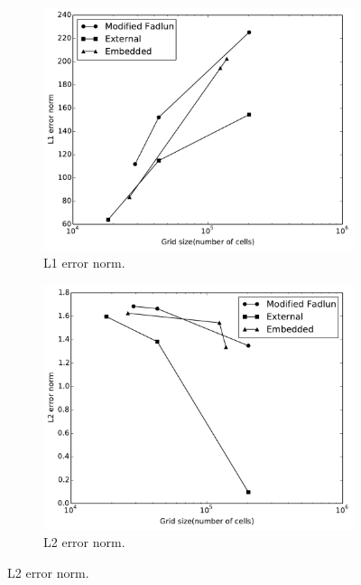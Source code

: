\begin{figure}[H]
	\centering
	\begin{subfigure}{0.6\textwidth}
		\includegraphics[width=\linewidth]{L1_error_norm}
		\caption{L1 error norm.}
	\end{subfigure}
	
	\begin{subfigure}{0.6\textwidth}
		\includegraphics[width=\linewidth]{L2_error_norm}
		\caption{L2 error norm.}
	\end{subfigure}
	

\end{figure}
